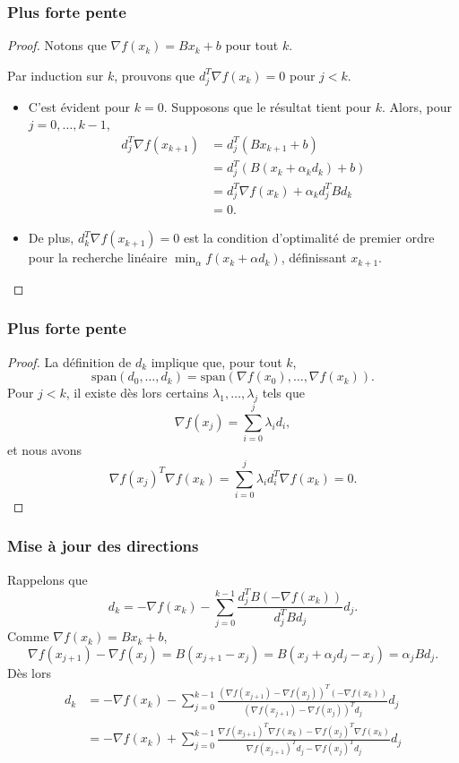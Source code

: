 \documentclass[usepdftitle=false]{beamer}
\begin{document}
\begin{frame}
\frametitle{Plus forte pente}

\begin{proof}
Notons que $\nabla f(x_k) = B x_k + b$ pour tout $k$.

Par induction sur $k$, prouvons que $d_j^T \nabla f(x_k) = 0$ pour $j < k$.
\begin{itemize}
\item
C'est évident pour $k = 0$.
Supposons que le résultat tient pour $k$.
Alors, pour $j = 0,\ldots,k-1$,
\begin{align*}
d_j^T \nabla f(x_{k + 1})
&= d_j^T (B x_{k+1} + b) \\
&= d_j^T (B (x_k+ \alpha_kd_k) + b) \\
&= d_j^T \nabla f(x_k) + \alpha_k d_j^T B d_k \\
&= 0.
\end{align*}
\item
De plus,
$d_k^T \nabla f(x_{k + 1}) = 0$
est la condition d'optimalité de premier ordre pour la recherche linéaire $\min_{\alpha} f(x_k + \alpha d_k)$, définissant $x_{k+1}$.

\end{itemize}
\end{proof}

\end{frame}

\begin{frame}
\frametitle{Plus forte pente}

\begin{proof}
La définition de $d_k$ implique que, pour tout $k$,
$$
\mbox{span}(d_0,\ldots, d_k)
= \mbox{span}(\nabla f(x_0),\ldots, \nabla f(x_k)).
$$
Pour $j < k$, il existe dès lors certains $\lambda_1,\ldots, \lambda_j$ tels que
$$
\nabla f(x_j) = \sum_{i = 0}^j \lambda_i d_i,
$$
et nous avons
$$
\nabla f(x_j)^T \nabla f(x_k)
=  \sum_{i = 0}^j \lambda_i d_i^T \nabla f(x_k) = 0.
$$
\end{proof}

\end{frame}

\begin{frame}
\frametitle{Mise à jour des directions}

Rappelons que
$$
d_k = -\nabla f(x_k) - \sum_{j = 0}^{k-1} \frac{d_j^TB(-\nabla f(x_k))}{d_j^TBd_j} d_j.
$$
Comme $\nabla f(x_k) = B x_k + b$,
$$
\nabla f(x_{j+1}) - \nabla f(x_j)
= B (x_{j+1} - x_j)
= B (x_j + \alpha_j d_j - x_j)
= \alpha_j B d_j.
$$
Dès lors
\begin{align*}
d_k
&= -\nabla f(x_k) - \sum_{j = 0}^{k-1} \frac{(\nabla f(x_{j+1}) - \nabla f(x_j))^T(-\nabla f(x_k))}{(\nabla f(x_{j+1}) - \nabla f(x_j))^Td_j} d_j \\
&= -\nabla f(x_k) + \sum_{j = 0}^{k-1} \frac{\nabla f(x_{j+1})^T\nabla f(x_k) - \nabla f(x_j)^T\nabla f(x_k)}{\nabla f(x_{j+1})^Td_j - \nabla f(x_j)^Td_j} d_j
\end{align*}

\end{frame}
\end{document}
